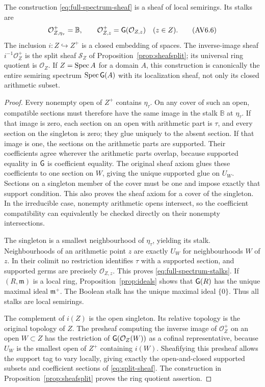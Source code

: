 \begin{theorem}\label{thm:fullspectral}
The construction \eqref{eq:full-spectrum-sheaf} is a sheaf of local
semirings. Its stalks are
\[
 \mathcal O_{Z,\eta_\tau}^+=\mathbb B,\qquad
 \mathcal O_{Z,z}^+=\mathsf G(\mathcal O_{Z,z})\quad(z\in Z).
 \tag{AV6.6}\label{eq:full-spectrum-stalks}
\]
The inclusion $i:Z\hookrightarrow Z^+$ is a closed embedding of spaces.
The inverse-image sheaf $i^{-1}\mathcal O_Z^+$ is the split sheaf
$\mathcal S_Z$ of Proposition~\ref{prop:sheafsplit}; its universal
ring quotient is $\mathcal O_Z$.
If $Z=\operatorname{Spec} A$ for a domain $A$, this construction is canonically the
entire semiring spectrum $\operatorname{Spec}\mathsf G(A)$ with its localization sheaf,
not only its closed arithmetic subset.
\end{theorem}
\begin{proof}
Every nonempty open of $Z^+$ contains $\eta_\tau$. On any cover of such
an open, compatible sections must therefore have the same image in
the stalk $\mathbb B$ at $\eta_\tau$. If that image is zero, each section
on an open with arithmetic part is $\tau$, and every section on the
singleton is zero; they glue uniquely to the absent section. If that
image is one, the sections on the arithmetic parts are supported.
Their coefficients agree wherever the arithmetic parts overlap,
because supported equality in $\mathsf G$ is coefficient equality. The
original sheaf axiom glues these coefficients to one section on $W$,
giving the unique supported glue on $U_W$. Sections on a singleton
member of the cover must be one and impose exactly that support
condition. This also proves the sheaf axiom for a cover of the
singleton. In the irreducible case, nonempty arithmetic opens intersect,
so the coefficient compatibility can equivalently be checked directly
on their nonempty intersections.

The singleton is a smallest neighbourhood of $\eta_\tau$, yielding
its stalk. Neighbourhoods of an arithmetic point $z$ are exactly $U_W$
for neighbourhoods $W$ of $z$. In their colimit no restriction identifies
$\tau$ with a supported section, and supported germs are precisely
$\mathcal O_{Z,z}$. This proves \eqref{eq:full-spectrum-stalks}.
If $(R,\mathfrak m)$ is a local ring, Proposition~\ref{prop:ideals}
shows that $\mathsf G(R)$ has the unique maximal ideal $\mathfrak m^+$.
The Boolean stalk has the unique maximal ideal $\{0\}$.
Thus all stalks are local semirings.

The complement of $i(Z)$ is the open singleton. Its relative topology
is the original topology of $Z$. The presheaf computing the inverse
image of $\mathcal O_Z^+$ on an open $W\subset Z$ has the restriction
of $\mathsf G(\mathcal O_Z(W))$ as a cofinal representative, because $U_W$
is the smallest open of $Z^+$ containing $i(W)$. Sheafifying this
presheaf allows the support tag to vary locally, giving exactly the
open-and-closed supported subsets and coefficient sections of
\eqref{eq:split-sheaf}. The construction in
Proposition~\ref{prop:sheafsplit} proves the ring quotient assertion.


\end{proof}
